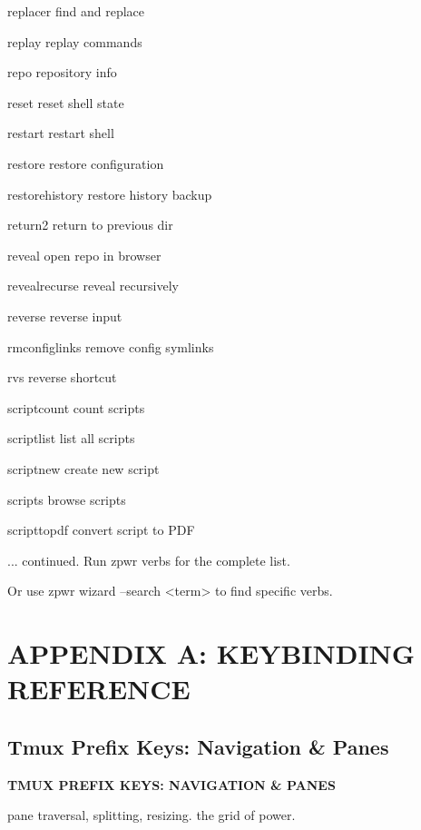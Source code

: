 \documentclass[11pt,a4paper,twoside]{book}
\begin{document}
replacer                   find and replace

replay                     replay commands

repo                       repository info

reset                      reset shell state

restart                    restart shell

restore                    restore configuration

restorehistory             restore history backup

return2                    return to previous dir

reveal                     open repo in browser

revealrecurse              reveal recursively

reverse                    reverse input

rmconfiglinks              remove config symlinks

rvs                        reverse shortcut

scriptcount                count scripts

scriptlist                 list all scripts

scriptnew                  create new script

scripts                    browse scripts

scripttopdf                convert script to PDF

... continued. Run zpwr verbs for the complete list.

Or use zpwr wizard --search <term> to find specific verbs.


\vspace{16pt}


\chapter{APPENDIX A: KEYBINDING REFERENCE}

\section{Tmux Prefix Keys: Navigation \& Panes}


\vspace{10pt}
{\large\bfseries\color{neoncyan} TMUX PREFIX KEYS: NAVIGATION \& PANES}\vspace{6pt}

pane traversal, splitting, resizing. the grid of power.
\end{document}
